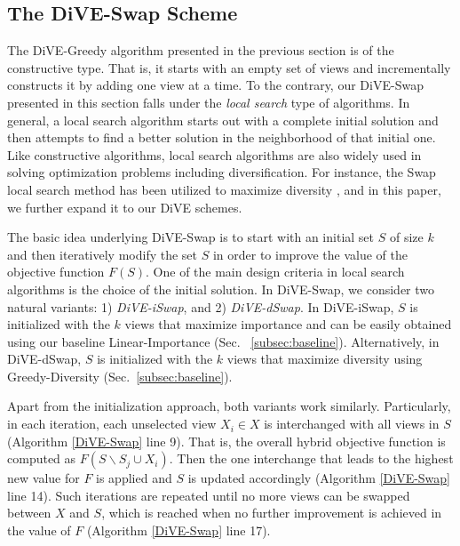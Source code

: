 

\subsection{The DiVE-Swap Scheme}
\label{subsec:dive-swap}
The DiVE-Greedy algorithm presented in the previous section is of the constructive type. 
%
That is, it starts with an empty set of views and incrementally constructs it by adding one view at a time. 
%
To the contrary, our DiVE-Swap presented in this section falls under the {\em local search} type of algorithms. 
%
In general, a local search algorithm starts out with a complete initial solution and then attempts to find a better solution in the neighborhood of that initial one. 
%
Like constructive algorithms, local search algorithms are also widely used in solving optimization problems including diversification. 
%
For instance, the Swap local search method has been utilized to maximize diversity \cite{Drosou, Vieira2011, DBLP:conf/sigmod/HussainKS15}, and in this paper, we further expand it to our DiVE schemes. 

The basic idea underlying DiVE-Swap is to start with an initial set $S$ of size $k$ and then iteratively modify the set $S$ in order to improve the value of the objective function $F(S)$. 
%
One of the main design criteria in local search algorithms is the choice of the initial solution. 
%
In DiVE-Swap, we consider two natural variants: 1) {\em DiVE-iSwap}, and 2) {\em DiVE-dSwap}. 
%
In DiVE-iSwap, $S$ is initialized with the $k$ views that maximize importance and can be easily obtained using our baseline Linear-Importance (Sec. ~\ref{subsec:baseline}).
%
Alternatively, in DiVE-dSwap, $S$ is initialized with the $k$ views that maximize diversity using Greedy-Diversity (Sec.~\ref{subsec:baseline}).
%

Apart from the initialization approach, both variants work similarly. 
%
Particularly, in each iteration, each unselected view $X_i \in X$ is interchanged with all views in $S$ (Algorithm \ref{DiVE-Swap} line 9). 
%
%
That is, the overall hybrid objective function is computed as $F(S \backslash S_j \cup X_i)$.  
%
Then the one interchange that leads to the highest new value for $F$ is applied and $S$ is updated accordingly (Algorithm \ref{DiVE-Swap} line 14). 
%
Such iterations are repeated until no more views can be swapped between $X$ and $S$, which is reached when no further improvement is achieved in the value of $F$ (Algorithm \ref{DiVE-Swap} line 17).   


